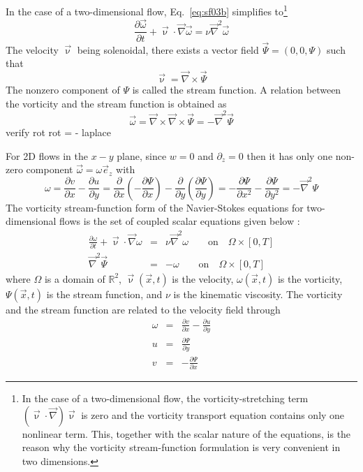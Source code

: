 In the case of a two-dimensional flow, Eq.~\eqref{eq:sf03b} simplifies to\footnote{
In the case of a two-dimensional flow, the vorticity-stretching term $(\vec\upnu\cdot\vec\nabla)\vec\upnu$ is zero and the vorticity transport equation contains only one nonlinear term. This,
together with the scalar nature of the equations, is the reason why the vorticity
stream-function formulation is very convenient in two dimensions.
}
\[
\frac{\partial \vec\omega}{\partial t}
+ \vec\upnu  \cdot \vec\nabla \vec\omega
=
\nu \vec\nabla^2 \vec\omega
\]
The velocity $\vec\upnu$ being solenoidal, there exists a vector field 
$\vec\Psi=(0,0,\Psi)$ such that 
\[
\vec\upnu = \vec\nabla \times \vec\Psi
\]
The nonzero component of $\Psi$ is called the stream function. A relation between
the vorticity and the stream function is obtained as
\[
\vec\omega = \vec\nabla \times \vec\nabla \times \vec\Psi = - \vec\nabla^2 \vec\Psi
\]
{\color{orange} verify rot rot = - laplace}


For 2D flows in the $x-y$ plane, since $w=0$ and $\partial_z=0$ then 
it has only one non-zero component $\vec{\omega}=\omega \vec{e}_z$ with 
\[
\omega 
= \frac{\partial v}{\partial x} - \frac{\partial u}{\partial y}
= \frac{\partial }{\partial x} (-\frac{\partial \Psi}{\partial x}) 
- \frac{\partial }{\partial y} (\frac{\partial \Psi}{\partial y})
= -\frac{\partial \Psi}{\partial x^2} -\frac{\partial \Psi}{\partial y^2} 
=- \vec\nabla^2 \Psi
\]
The vorticity stream-function form of the Navier-Stokes equations for two-
dimensional flows is the set of coupled scalar equations given below :
\begin{eqnarray}
\frac{\partial \omega}{\partial t} + \vec\upnu  \cdot \vec\nabla \omega
&=&
\nu \vec\nabla^2 \omega  \qquad \text{on} \quad \Omega \times [0,T] \label{eq:s22}\\
\vec\nabla^2 \vec\Psi &=& -\omega \qquad \text{on} \quad \Omega \times [0,T] 
\end{eqnarray}
where $\Omega$ is a domain of ${\mathbb R}^2$, $\vec\upnu(\vec{x},t)$ is the velocity, $\omega(\vec{x},t)$
is the vorticity, $\Psi(\vec x,t)$ is the stream function, and $\nu$ is the kinematic viscosity.
The vorticity and the stream function are related to the velocity field through
\begin{eqnarray}
\omega &=& \frac{\partial v}{\partial x} - \frac{\partial u}{\partial y} \\
u &=& \frac{\partial \Psi}{\partial y} \\
v &=& -\frac{\partial \Psi}{\partial x} 
\end{eqnarray}

